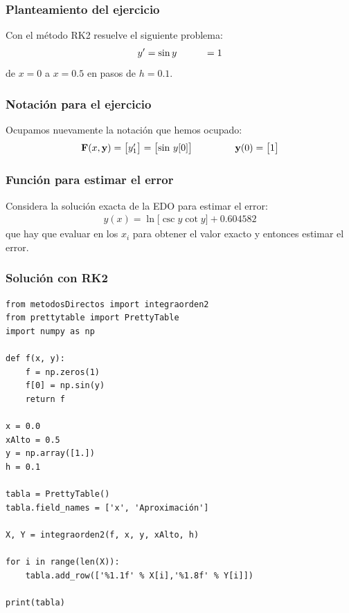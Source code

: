 \documentclass[12pt]{beamer}
\begin{document}
\begin{frame}
\frametitle{Planteamiento del ejercicio}
Con el método RK2 resuelve el siguiente problema:
\pause
\begin{align*}
{y}^{\prime} = \sin y \hspace{1cm} = 1
\end{align*}
de $x = 0$ a $x = 0.5$ en pasos de $h = 0.1$.
\end{frame}
\begin{frame}
\frametitle{Notación para el ejercicio}
Ocupamos nuevamente la notación que hemos ocupado:
\begin{align*}
\mathbf{F} (x, \mathbf{y}) = 
\begin{bmatrix}
{y}^{\prime}_{1}
\end{bmatrix} =
\begin{bmatrix}
\sin \, y[0]
\end{bmatrix}
\hspace{1.5cm}
\mathbf{y} (0) = 
\begin{bmatrix}
1
\end{bmatrix}
\end{align*}
\end{frame}
\begin{frame}
\frametitle{Función para estimar el error}
Considera la solución exacta de la EDO para estimar el error:
\pause
\begin{align*}
y (x) = \ln \big[ \csc y \cot y \big] + 0.604582
\end{align*}
que hay que evaluar en los $x_{i}$ para obtener el valor exacto y entonces estimar el error.
\end{frame}
\begin{frame}
\frametitle{Solución con RK2}
\begin{lstlisting}[caption=Código para resolver con RK2 el ejercicio]
from metodosDirectos import integraorden2
from prettytable import PrettyTable
import numpy as np

def f(x, y):
	f = np.zeros(1)
	f[0] = np.sin(y)
	return f

x = 0.0
xAlto = 0.5
y = np.array([1.])
h = 0.1

tabla = PrettyTable()
tabla.field_names = ['x', 'Aproximación']

X, Y = integraorden2(f, x, y, xAlto, h)

for i in range(len(X)):
	tabla.add_row(['%1.1f' % X[i],'%1.8f' % Y[i]])

print(tabla)
\end{lstlisting}
\end{frame}
\end{document}
